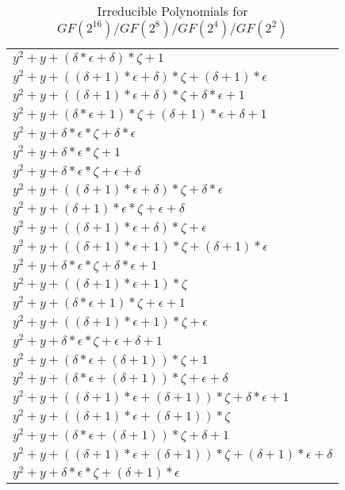\documentclass[12pt]{article}
\begin{document}
\begin{center}
\begin{longtable}{|l|}
\caption[INNER TITLE]{Irreducible Polynomials for $GF(2^{16})/GF(2^8)/GF(2^4)/GF(2^2)$}\\
\hline
	$y^2 + y + (\delta*\epsilon + \delta)*\zeta + 1$ \\
	$y^2 + y + ((\delta + 1)*\epsilon + \delta)*\zeta + (\delta + 1)*\epsilon$ \\
	$y^2 + y + ((\delta + 1)*\epsilon + \delta)*\zeta + \delta*\epsilon + 1$ \\
	$y^2 + y + (\delta*\epsilon + 1)*\zeta + (\delta + 1)*\epsilon + \delta + 1$ \\
	$y^2 + y + \delta*\epsilon*\zeta + \delta*\epsilon$ \\ 
	$y^2 + y + \delta*\epsilon*\zeta + 1$ \\
	$y^2 + y + \delta*\epsilon*\zeta + \epsilon + \delta$ \\
	$y^2 + y + ((\delta + 1)*\epsilon + \delta)*\zeta + \delta*\epsilon$ \\
	$y^2 + y + (\delta + 1)*\epsilon*\zeta + \epsilon + \delta$ \\
	$y^2 + y + ((\delta + 1)*\epsilon + \delta)*\zeta + \epsilon$ \\
	$y^2 + y + ((\delta + 1)*\epsilon + 1)*\zeta + (\delta + 1)*\epsilon$ \\
	$y^2 + y + \delta*\epsilon*\zeta + \delta*\epsilon + 1$ \\
	$y^2 + y + ((\delta + 1)*\epsilon + 1)*\zeta$ \\
	$y^2 + y + (\delta*\epsilon + 1)*\zeta + \epsilon + 1$ \\
	$y^2 + y + ((\delta + 1)*\epsilon + 1)*\zeta + \epsilon$ \\
	$y^2 + y + \delta*\epsilon*\zeta + \epsilon + \delta + 1$ \\
	$y^2 + y + (\delta*\epsilon + (\delta + 1))*\zeta + 1$ \\
	$y^2 + y + (\delta*\epsilon + (\delta + 1))*\zeta + \epsilon + \delta$ \\
	$y^2 + y + ((\delta + 1)*\epsilon + (\delta + 1))*\zeta + \delta*\epsilon + 1$ \\
	$y^2 + y + ((\delta + 1)*\epsilon + (\delta + 1))*\zeta$ \\
	$y^2 + y + (\delta*\epsilon + (\delta + 1))*\zeta + \delta + 1$ \\
	$y^2 + y + ((\delta + 1)*\epsilon + (\delta + 1))*\zeta + (\delta + 1)*\epsilon + \delta$ \\
	$y^2 + y + \delta*\epsilon*\zeta + (\delta + 1)*\epsilon$ \\

\end{longtable}
\end{center}
\end{document}
